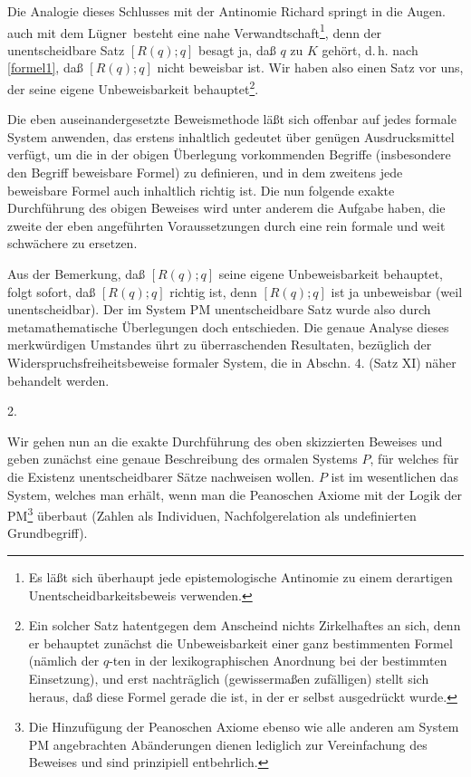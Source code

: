 \documentclass{scrartcl}
\begin{document}
Die Analogie dieses Schlusses mit der Antinomie Richard
springt in die Augen. auch mit dem 
\glqq Lügner\grqq\ besteht eine nahe 
Verwandtschaft\footnote{Es läßt sich überhaupt jede epistemologische Antinomie zu einem derartigen Unentscheidbarkeitsbeweis verwenden.},
denn der unentscheidbare Satz $[R(q); q]$ besagt ja,
daß $q$ zu $K$ gehört, d.\,h. nach \ref{formel1},
daß $[R(q); q]$ nicht beweisbar ist. Wir haben
also einen Satz vor uns, der seine eigene
Unbeweisbarkeit behauptet\footnote{Ein solcher Satz hatentgegen dem Anscheind nichts Zirkelhaftes an sich, denn er behauptet zunächst die Unbeweisbarkeit einer ganz bestimmenten Formel (nämlich der $q$-ten in der lexikographischen Anordnung bei der bestimmten Einsetzung), und erst nachträglich (gewissermaßen
zufälligen) stellt sich heraus, daß diese Formel gerade die ist, in der er selbst ausgedrückt wurde.}.

Die eben auseinandergesetzte Beweismethode läßt sich 
offenbar auf jedes formale System anwenden, das erstens 
inhaltlich gedeutet über genügen Ausdrucksmittel
verfügt, um die in der obigen Überlegung vorkommenden
Begriffe (insbesondere den Begriff \glqq beweisbare
Formel\grqq) zu definieren, und in dem zweitens jede
beweisbare Formel auch inhaltlich richtig ist. Die
nun folgende exakte Durchführung des obigen Beweises
wird unter anderem die Aufgabe haben, die zweite der eben
angeführten Voraussetzungen durch eine rein formale und 
weit schwächere zu ersetzen.

Aus der Bemerkung, daß $[R(q); q]$ seine eigene 
Unbeweisbarkeit behauptet, folgt sofort, daß $[R(q); q]$ 
richtig ist, denn $[R(q); q]$ ist ja unbeweisbar (weil 
unentscheidbar). Der im System PM unentscheidbare Satz 
wurde also durch metamathematische Überlegungen doch
entschieden. Die genaue Analyse dieses merkwürdigen 
Umstandes ührt zu überraschenden Resultaten, bezüglich der
Widerspruchsfreiheitsbeweise formaler System, die in Abschn. 4. (Satz XI) näher behandelt werden.

\begin{center}
2.
\end{center}

Wir gehen nun an die exakte Durchführung des
oben skizzierten Beweises und geben zunächst eine
genaue Beschreibung des ormalen Systems $P$, für welches
für die Existenz unentscheidbarer Sätze nachweisen wollen. 
$P$ ist im wesentlichen das System, welches man erhält, 
wenn man die Peanoschen Axiome mit der Logik
der PM\footnote{Die Hinzufügung der Peanoschen Axiome ebenso wie alle anderen am System PM angebrachten Abänderungen dienen lediglich zur Vereinfachung des Beweises und sind prinzipiell entbehrlich.}
überbaut (Zahlen als Individuen, Nachfolgerelation
als undefinierten Grundbegriff).
\end{document}
